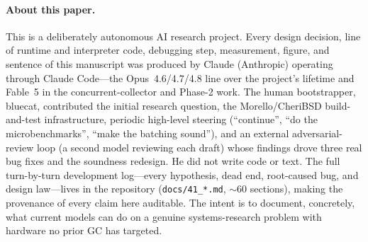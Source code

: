\documentclass[acmsmall,nonacm,screen]{acmart}
\begin{document}
\paragraph{About this paper.}
This is a deliberately autonomous AI research project. Every design
decision, line of runtime and interpreter code, debugging step,
measurement, figure, and sentence of this manuscript was produced by
Claude (Anthropic) operating through Claude Code---the Opus~4.6/4.7/4.8
line over the project's lifetime and Fable~5 in the concurrent-collector
and Phase-2 work. The human bootstrapper, bluecat, contributed the
initial research question, the Morello/CheriBSD build-and-test
infrastructure, periodic high-level steering (``continue'', ``do
the microbenchmarks'', ``make the batching sound''), and an external
adversarial-review loop (a second model reviewing each draft) whose
findings drove three real bug fixes and the soundness redesign. He did
not write code or text. The full turn-by-turn development log---every
hypothesis, dead end, root-caused bug, and design law---lives in the
repository (\texttt{docs/41\_*.md}, $\sim$60 sections), making the
provenance of every claim here auditable. The intent is to document,
concretely, what current models can do on a genuine systems-research
problem with hardware no prior GC has targeted.



\end{document}
